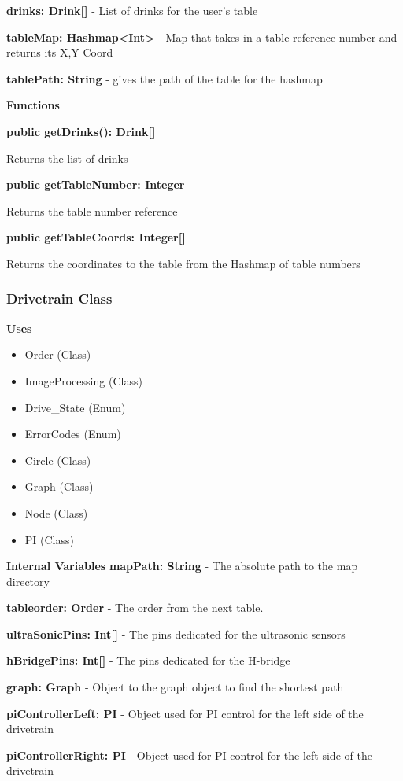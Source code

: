 \documentclass [10pt]{article}
\begin{document}
\textbf{drinks: Drink[]} - List of drinks for the user's table

\textbf{tableMap: Hashmap<Int>} -  Map that takes in a table reference number and returns its X,Y Coord

\textbf{tablePath: String} - gives the path of the table for the hashmap 

\textbf{Functions}

\textbf{public getDrinks(): Drink[]}

Returns the list of drinks

\textbf{public getTableNumber: Integer}

Returns the table number reference

\textbf{public getTableCoords: Integer[]}

Returns the coordinates to the table from the Hashmap of table numbers

\subsubsection{Drivetrain Class}
\textbf{Uses}
\begin{itemize}
	\item Order (Class)
	\item ImageProcessing (Class)
	\item Drive\_State (Enum)
	\item ErrorCodes (Enum)
	\item Circle (Class)
	\item Graph (Class)
	\item Node (Class)
	\item PI (Class)
\end{itemize}


\textbf{Internal Variables}
\textbf{mapPath: String} - The absolute path to the map directory

\textbf{tableorder: Order} - The order from the next table.

\textbf{ultraSonicPins: Int[]} - The pins dedicated for the ultrasonic sensors

\textbf{hBridgePins: Int[]} - The pins dedicated for the H-bridge

\textbf{graph: Graph} - Object to the graph object to find the shortest path

\textbf{piControllerLeft: PI} - Object used for PI control for the left side of the drivetrain

\textbf{piControllerRight: PI} - Object used for PI control for the left side of the drivetrain
\end{document}
